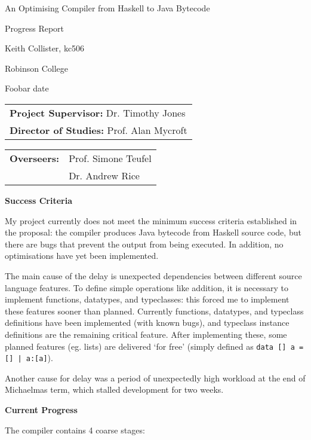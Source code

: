 \documentclass[11pt]{article}
\newcommand\haskell[1]{\texttt{#1}}
\begin{document}
\thispagestyle{empty}

\centerline{\large An Optimising Compiler from Haskell to Java Bytecode}
\centerline{\large Progress Report}
\vspace{0.2in}

\centerline{Keith Collister, kc506}
\centerline{Robinson College}
\centerline{Foobar date}

\vspace{0.2in}



\begin{tabular}[t]{@{}l}
{\bf Project Supervisor:} Dr. Timothy Jones \\[3mm]
{\bf Director of Studies:} Prof. Alan Mycroft
\end{tabular}
\hfill
\begin{tabular}[t]{@{}l @{}l}
{\bf Overseers: } & Prof. Simone Teufel \\[3mm]
& Dr. Andrew Rice
\end{tabular}

\vspace{0.3in}

\large{\bf Success Criteria}

My project currently does not meet the minimum success criteria established in the proposal: the compiler produces Java
bytecode from Haskell source code, but there are bugs that prevent the output from being executed. In addition, no
optimisations have yet been implemented.

The main cause of the delay is unexpected dependencies between different source language features. To define simple
operations like addition, it is necessary to implement functions, datatypes, and typeclasses: this forced me to
implement these features sooner than planned. Currently functions, datatypes, and typeclass definitions have been
implemented (with known bugs), and typeclass instance definitions are the remaining critical feature. After implementing
these, some planned features (eg. lists) are delivered `for free' (simply defined as \haskell{data [] a = [] | a:[a]}).

Another cause for delay was a period of unexpectedly high workload at the end of Michaelmas term, which stalled
development for two weeks.

\large{\bf Current Progress}

The compiler contains 4 coarse stages:
\end{document}

